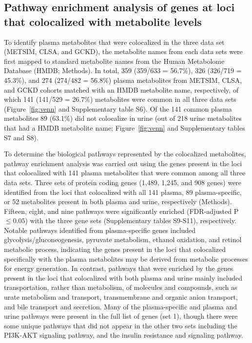 \documentclass[gucdd,article,submit,pdftex,moreauthors]{Definitions/mdpi}
\begin{document}
\subsection{Pathway enrichment analysis of genes at loci that colocalized with metabolite levels}
To identify plasma metabolites that were colocalized in the three data set (METSIM, CLSA, and GCKD), the metabolite names from each data sets were first mapped to standard metabolite names from the Human Metabolome Database (HMDB; Methods).
In total, 359 (359/633 = 56.7\%), 326 (326/719 = 45.3\%), and 274 (274/482 = 56.8\%) plasma metabolites from METSIM, CLSA, and GCKD cohorts matched with an HMDB metabolite name, respectively, of which 141 (141/529 = 26.7\%) metabolites were common in all three data sets (Figure~\ref{fig:venn} and Supplementary table S6).
Of the 141 common plasma metabolites 89 (63.1\%) did not colocalize in urine (out of 218 urine metabolites that had a HMDB metabolite name; Figure~\ref{fig:venn} and Supplementary tables S7 and S8).

To determine the biological pathways represented by the colocalized metabolites, pathway enrichment analysis was carried out using the genes present in the loci that colocalized with 141 plasma metabolites that were common among all three data sets.
Three sets of protein coding genes (1,489, 1,245, and 908 genes) were identified from the loci that colocalized with all 141 plasma, 89 plasma-specific, or 52 metabolites present in both plasma and urine, respectively (Methods).
Fifteen, eight, and nine pathways were significantly enriched (FDR-adjusted P $\le 0.05$) with the three gene sets (Supplementary tables S9-S11), respectively.
Notable pathways identified from plasma-specific genes included glycolysis/gluconeogenesis, pyruvate metabolism, ethanol oxidation, and retinol metabolic process, indicating the genes present in the loci that colocalized specifically with the plasma metabolites may be derived from metabolic processes for energy generation.
In contrast, pathways that were enriched by the genes present in the loci that colocalized with both plasma and urine mainly included transportation, rather than metabolism, of molecules and compounds, such as urate metabolism and transport, transmembrane and organic anion transport, and bile transport and secretion.
Many of the plasma-specific and plasma and urine pathways were present in the full list of genes (set 1), though there were some unique pathways that did not appear in the other two sets including the PI3K-AKT signaling pathway, and the insulin resistance and signaling pathway.
\end{document}
